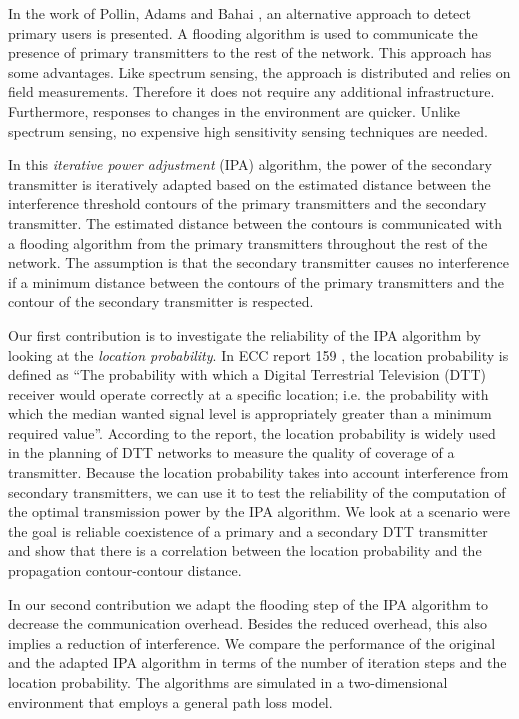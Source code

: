 In the work of Pollin, Adams and Bahai \cite{sofie}, an alternative approach to detect primary users is presented. A flooding algorithm is used to communicate the presence of primary transmitters to the rest of the network. This approach has some advantages. Like spectrum sensing, the approach is distributed and relies on field measurements. Therefore it does not require any additional infrastructure. Furthermore, responses to changes in the environment are quicker. Unlike spectrum sensing, no expensive high sensitivity sensing techniques are needed. 

In this \textit{iterative power adjustment} (IPA) algorithm, the power of the secondary transmitter is iteratively adapted based on the estimated distance between the interference threshold contours of the primary transmitters and the secondary transmitter. The estimated distance between the contours is communicated with a flooding algorithm from the primary transmitters throughout the rest of the network. The assumption is that the secondary transmitter causes no interference if a minimum distance between the contours of the primary transmitters and the contour of the secondary transmitter is respected.

Our first contribution is to investigate the reliability of the IPA algorithm by looking at the \textit{location probability}. In ECC report 159 \cite{ecc}, the location probability is defined as ``The probability with which a Digital Terrestrial Television (DTT) receiver would operate correctly at a specific location; i.e. the probability with which the median wanted signal level is appropriately greater than a minimum required value''.  According to the report, the location probability is widely used in the planning of DTT networks to measure the quality of coverage of a transmitter. Because the location probability takes into account interference from secondary transmitters, we can use it to test the reliability of the computation of the optimal transmission power by the IPA algorithm. We look at a scenario were the goal is reliable coexistence of a primary and a secondary DTT transmitter and show that there is a correlation between the location probability and the propagation contour-contour distance. 

In our second contribution we adapt the flooding step of the IPA algorithm to decrease the communication overhead. Besides the reduced overhead, this also implies a reduction of interference. We compare the performance of the original and the adapted IPA algorithm in terms of the number of iteration steps and the location probability. The algorithms are simulated in a two-dimensional environment that employs a general path loss model.


